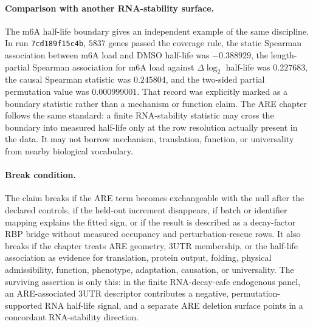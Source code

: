 \paragraph{Comparison with another RNA-stability surface.}
The m6A half-life boundary gives an independent example of the same discipline.  In run \texttt{7cd189f15c4b}, $5837$ genes passed the coverage rule, the static Spearman association between m6A load and DMSO half-life was $-0.388929$, the length-partial Spearman association for m6A load against $\Delta \log_2$ half-life was $0.227683$, the causal Spearman statistic was $0.245804$, and the two-sided partial permutation value was $0.000999001$.  That record was explicitly marked as a boundary statistic rather than a mechanism or function claim.  The ARE chapter follows the same standard: a finite RNA-stability statistic may cross the boundary into measured half-life only at the row resolution actually present in the data.  It may not borrow mechanism, translation, function, or universality from nearby biological vocabulary.

\paragraph{Break condition.}
The claim breaks if the ARE term becomes exchangeable with the null after the declared controls, if the held-out increment disappears, if batch or identifier mapping explains the fitted sign, or if the result is described as a decay-factor RBP bridge without measured occupancy and perturbation-rescue rows.  It also breaks if the chapter treats ARE geometry, 3UTR membership, or the half-life association as evidence for translation, protein output, folding, physical admissibility, function, phenotype, adaptation, causation, or universality.  The surviving assertion is only this: in the finite RNA-decay-cafe endogenous panel, an ARE-associated 3UTR descriptor contributes a negative, permutation-supported RNA half-life signal, and a separate ARE deletion surface points in a concordant RNA-stability direction.